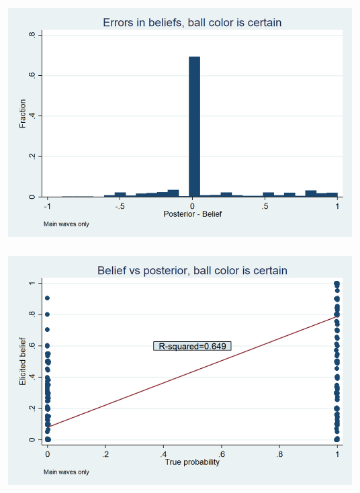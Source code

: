 \documentclass[11pt,a4paper]{article}
\begin{document}
\begin{figure}[H]
\begin{subfigure}[t]{.48\textwidth}
\end{subfigure}
\begin{subfigure}[t]{.48\textwidth}
  \centering
  \includegraphics[width=\textwidth]{Graphs/hist_belief_error_s5.png}
\end{subfigure}
\begin{subfigure}[t]{.48\textwidth}
  \centering
  \includegraphics[width=\textwidth]{Graphs/updating_s5.png}

\end{subfigure}

\end{figure}
\end{document}
